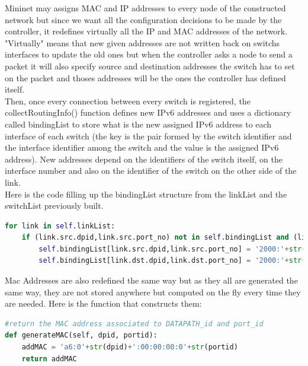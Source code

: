 \documentclass{article}
\begin{document}
Mininet may assigns MAC and IP addresses to every node of the
constructed network but since we want all the configuration decisions
to be made by the controller, it redefines virtually all the IP
and MAC addresses of the network. "Virtually" means that new given
addresses are not written back on switchs interfaces to update the old
ones but when the controller asks a node to send a packet it will also
specify source and destination addresses the switch has to set on the
packet and thoses addresses will be the ones the controller has
defined itself.\\
\newline
Then, once every connection between every switch is registered, the
collectRoutingInfo() function defines new IPv6 addresses and uses a
dictionary called bindingList to store what is the new assigned IPv6
address to each interface of each switch (the key is the pair formed
by the switch identifier and the interface identifier among the switch
and the value is the assigned IPv6 address). New addresses depend on
the identifiers of the switch itself, on the interface number and also
on the identifier of the switch on the other side of the link.\\
\newline
Here is the code filling up the bindingList structure from the linkList
and the switchList previously built.

\begin{lstlisting}[frame=single,language=Python,breaklines=true] 
for link in self.linkList:
    if (link.src.dpid,link.src.port_no) not in self.bindingList and (link.dst.dpid,link.dst.port_no) not in self.bindingList :
        self.bindingList[link.src.dpid,link.src.port_no] = '2000:'+str(link.src.dpid)+str(link.dst.dpid)+'::'+str(link.src.dpid)
        self.bindingList[link.dst.dpid,link.dst.port_no] = '2000:'+str(link.src.dpid)+str(link.dst.dpid)+'::'+str(link.dst.dpid)
\end{lstlisting}

Mac Addresses are also redefined the same way but as they all are
generated the same way, they are not stored anywhere but computed on
the fly every time they are needed. Here is the function that
constructs them:

\begin{lstlisting}[frame=single,language=Python,breaklines=true] 
#return the MAC address associated to DATAPATH_id and port_id
def generateMAC(self, dpid, portid):
    addMAC = 'a6:0'+str(dpid)+':00:00:00:0'+str(portid)
    return addMAC
\end{lstlisting}
\end{document}
